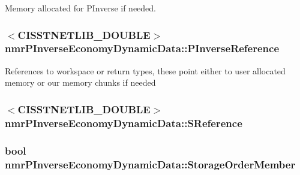 Memory allocated for P\-Inverse if needed. \hypertarget{classnmr_p_inverse_economy_dynamic_data_a398e793024cec70ccadfa4ba192ac3f6}{
\subsubsection[{P\-Inverse\-Reference}]{$<$C\-I\-S\-S\-T\-N\-E\-T\-L\-I\-B\-\_\-\-D\-O\-U\-B\-L\-E$>$ nmr\-P\-Inverse\-Economy\-Dynamic\-Data\-::\-P\-Inverse\-Reference\hspace{0.3cm}{\ttfamily [protected]}}}\label{classnmr_p_inverse_economy_dynamic_data_a398e793024cec70ccadfa4ba192ac3f6}
References to workspace or return types, these point either to user allocated memory or our memory chunks if needed \hypertarget{classnmr_p_inverse_economy_dynamic_data_a4c1babef12716a337989755812b539cf}{
\subsubsection[{S\-Reference}]{$<$C\-I\-S\-S\-T\-N\-E\-T\-L\-I\-B\-\_\-\-D\-O\-U\-B\-L\-E$>$ nmr\-P\-Inverse\-Economy\-Dynamic\-Data\-::\-S\-Reference\hspace{0.3cm}{\ttfamily [protected]}}}\label{classnmr_p_inverse_economy_dynamic_data_a4c1babef12716a337989755812b539cf}
\hypertarget{classnmr_p_inverse_economy_dynamic_data_ad55d46196af57e35da890f204b503e6c}{
\subsubsection[{Storage\-Order\-Member}]{\setlength{\rightskip}{0pt plus 5cm}bool nmr\-P\-Inverse\-Economy\-Dynamic\-Data\-::\-Storage\-Order\-Member\hspace{0.3cm}{\ttfamily [protected]}}}\label{classnmr_p_inverse_economy_dynamic_data_ad55d46196af57e35da890f204b503e6c}
